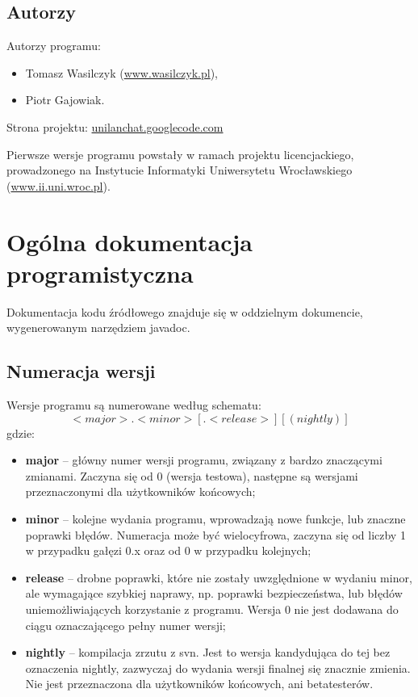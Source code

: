 \documentclass[11pt,leqno]{article}
\begin{document}
\subsection{Autorzy}

Autorzy programu:
\begin{itemize}
	\item Tomasz Wasilczyk (\href{http://www.wasilczyk.pl}{www.wasilczyk.pl}),
	\item Piotr Gajowiak.
\end{itemize}

Strona projektu: \href{http://unilanchat.googlecode.com}{unilanchat.googlecode.com}

Pierwsze wersje programu powstały w ramach projektu licencjackiego, prowadzonego na Instytucie
Informatyki Uniwersytetu Wrocławskiego (\href{http://www.ii.uni.wroc.pl}{www.ii.uni.wroc.pl}).


\section{Ogólna dokumentacja programistyczna}

Dokumentacja kodu źródłowego znajduje się w oddzielnym dokumencie, wygenerowanym narzędziem javadoc.

\subsection{Numeracja wersji}

Wersje programu są numerowane według schematu:
\[
<major>.<minor>[.<release>][ (nightly)]
\]
gdzie:
\begin{itemize}
	\item \textbf{major} -- główny numer wersji programu, związany z bardzo znaczącymi zmianami.
	Zaczyna się od 0 (wersja testowa), następne są wersjami przeznaczonymi dla użytkowników
	końcowych;
	\item \textbf{minor} -- kolejne wydania programu, wprowadzają nowe funkcje, lub znaczne
	poprawki błędów. Numeracja może być wielocyfrowa, zaczyna się od liczby
	1 w przypadku gałęzi 0.x oraz od 0 w przypadku kolejnych;
	\item \textbf{release} -- drobne poprawki, które nie zostały uwzględnione w wydaniu minor,
	ale wymagające szybkiej naprawy, np. poprawki bezpieczeństwa, lub błędów
	uniemożliwiających korzystanie z programu. Wersja 0 nie jest dodawana
	do ciągu oznaczającego pełny numer wersji;
	\item \textbf{nightly} -- kompilacja zrzutu z svn. Jest to wersja kandydująca do tej bez
	oznaczenia nightly, zazwyczaj do wydania wersji finalnej się znacznie
	zmienia. Nie jest przeznaczona dla użytkowników końcowych, ani betatesterów.
\end{itemize}
\end{document}
